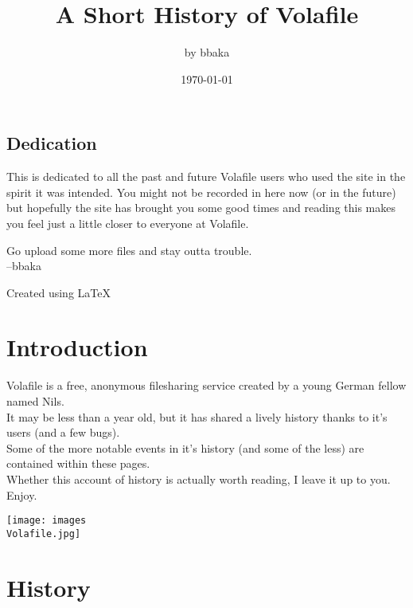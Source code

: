 \documentclass[12pt]{report}
\begin{document}
\setcounter{secnumdepth}{2}
{


\title{A Short History of Volafile}
\author{by bbaka\footnotemark}
\date{\today}
\maketitle
\tableofcontents
\pagebreak


\vfill
\section*{Dedication}
\parbox{\textwidth}{This is dedicated to all the past and future Volafile users who used the site in the spirit it was intended. You might not be recorded in here now (or in the future) but hopefully the site has brought you some good times and reading this makes you feel just a little closer to everyone at Volafile. \\ 
	\raggedright Go upload some more files and stay outta trouble.\\
		\raggedleft 
	--bbaka\\
}

\vfill

{ 
	\centering Created using \LaTeX 
}

\pagebreak

\chapter*{Introduction}
	Volafile is a free, anonymous filesharing service created by a young German fellow named Nils.\\
	It may be less than a year old, but it has shared a lively history thanks to it's users (and a few bugs). \\
	Some of the more notable events in it's history (and some of the less) are contained within these pages.\\
	Whether this account of history is actually worth reading, I leave it up to you.\\ 
Enjoy.

\begin{image}
	\centering
	\texttt{[image: images\\Volafile.jpg]}
\end{image}

\vfill
\pagebreak

\chapter{History}

}
\end{document}
